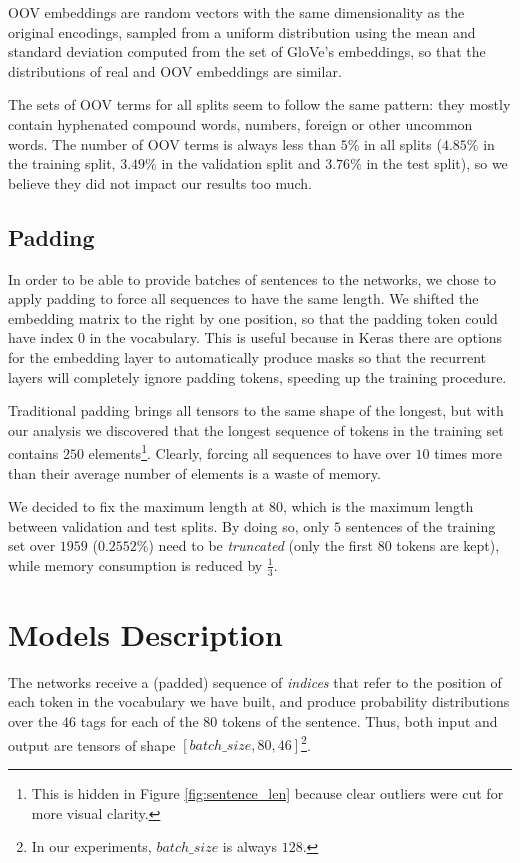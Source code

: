 \documentclass[letterpaper,10.8pt]{article}
\begin{document}
OOV embeddings are random vectors with the same dimensionality as the original encodings, sampled from a uniform distribution using the mean and standard deviation computed from the set of GloVe's embeddings, so that the distributions of real and OOV embeddings are similar.

The sets of OOV terms for all splits seem to follow the same pattern: they mostly contain hyphenated compound words, numbers, foreign or other uncommon words. The number of OOV terms is always less than $5\%$ in all splits ($4.85\%$ in the training split, $3.49\%$ in the validation split and $3.76\%$ in the test split), so we believe they did not impact our results too much.

\subsection{Padding}
In order to be able to provide batches of sentences to the networks, we chose to apply padding to force all sequences to have the same length. We shifted the embedding matrix to the right by one position, so that the padding token could have index 0 in the vocabulary. This is useful because in Keras there are options for the embedding layer to automatically produce masks so that the recurrent layers will completely ignore padding tokens, speeding up the training procedure.

Traditional padding brings all tensors to the same shape of the longest, but with our analysis we discovered that the longest sequence of tokens in the training set contains $250$ elements\footnote{This is hidden in Figure \ref{fig:sentence_len} because clear outliers were cut for more visual clarity.}. Clearly, forcing all sequences to have over $10$ times more than their average number of elements is a waste of memory.

We decided to fix the maximum length at $80$, which is the maximum length between validation and test splits. By doing so, only $5$ sentences of the training set over $1959$ ($0.2552\%$) need to be \emph{truncated} (only the first $80$ tokens are kept), while memory consumption is reduced by $\frac{1}{3}$.

\section{Models Description}

The networks receive a (padded) sequence of \emph{indices} that refer to the position of each token in the vocabulary we have built, and produce probability distributions over the $46$ tags for each of the $80$ tokens of the sentence. Thus, both input and output are tensors of shape $[batch\_size, 80, 46]$\footnote{In our experiments, $batch\_size$ is always $128$.}. 
\end{document}
